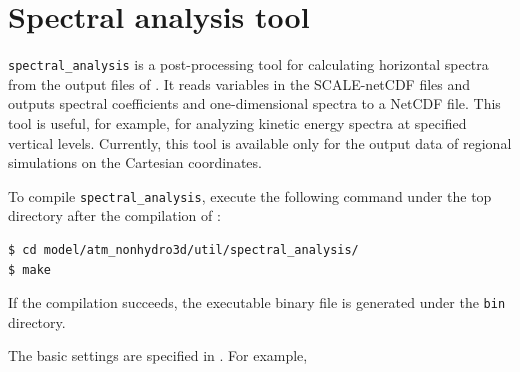 \section{Spectral analysis tool}
\label{sec:postprocess_spectral_analysis}

\verb|spectral_analysis| is a post-processing tool for calculating horizontal spectra from the output files of \scaledg.
It reads variables in the SCALE-netCDF files and outputs spectral coefficients and one-dimensional spectra to a NetCDF file.
This tool is useful, for example, for analyzing kinetic energy spectra at specified vertical levels.
Currently, this tool is available only for the output data of regional simulations on the Cartesian coordinates.

To compile \verb|spectral_analysis|, execute the following command under the top directory after the compilation of \scaledg:
\begin{verbatim}
$ cd model/atm_nonhydro3d/util/spectral_analysis/
$ make
\end{verbatim}
If the compilation succeeds, the executable binary file is generated under the \verb|bin| directory.

The basic settings are specified in .
For example,

